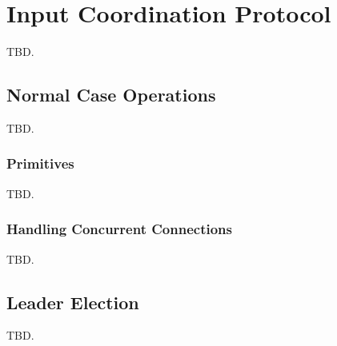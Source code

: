 \section{Input Coordination Protocol} \label{sec:input}

TBD.

\subsection{Normal Case Operations} \label{sec:normal}

TBD.

\subsubsection{Primitives} \label{sec:primitive}

TBD.

\subsubsection{Handling Concurrent Connections} \label{sec:concurrent}

TBD.

\subsection{Leader Election} \label{sec:election}

TBD.